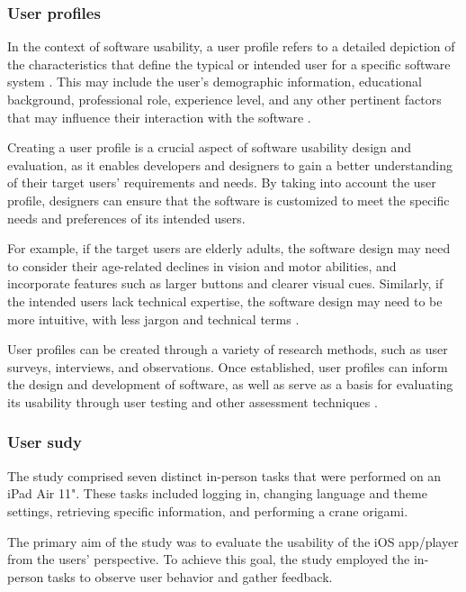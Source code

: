 \documentclass[conference,onecolumn]{IEEEtran}
\begin{document}
        \subsubsection{User profiles}\hfill

            In the context of software usability, a user profile refers to a detailed depiction of the characteristics that define the typical or intended user for a specific software system \cite{molich1990improving}. This may include the user's demographic information, educational background, professional role, experience level, and any other pertinent factors that may influence their interaction with the software \cite{molich1990improving}.

            Creating a user profile is a crucial aspect of software usability design and evaluation, as it enables developers and designers to gain a better understanding of their target users' requirements and needs. By taking into account the user profile, designers can ensure that the software is customized to meet the specific needs and preferences of its intended users\cite{rubin2008handbook}.

            For example, if the target users are elderly adults, the software design may need to consider their age-related declines in vision and motor abilities, and incorporate features such as larger buttons and clearer visual cues. Similarly, if the intended users lack technical expertise, the software design may need to be more intuitive, with less jargon and technical terms \cite{virzi1992refining}.

            User profiles can be created through a variety of research methods, such as user surveys, interviews, and observations. Once established, user profiles can inform the design and development of software, as well as serve as a basis for evaluating its usability through user testing and other assessment techniques \cite{albert2013measuring}.

        \subsubsection{User sudy}\hfill

            The study comprised seven distinct in-person tasks that were performed on an iPad Air 11". These tasks included logging in, changing language and theme settings, retrieving specific information, and performing a crane origami.

            The primary aim of the study was to evaluate the usability of the iOS app/player from the users' perspective. To achieve this goal, the study employed the in-person tasks to observe user behavior and gather feedback.
            
\end{document}
